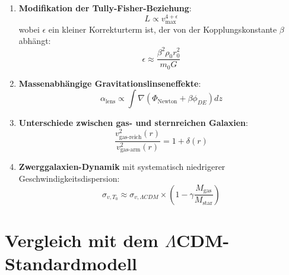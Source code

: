 \documentclass[a4paper,12pt]{article}
\theoremstyle{definition}
\theoremstyle{remark}
\begin{document}
	\begin{enumerate}
		\item \textbf{Modifikation der Tully-Fisher-Beziehung}:
		\begin{equation}
			L \propto v_{\text{max}}^{4+\epsilon}
		\end{equation}
		wobei $\epsilon$ ein kleiner Korrekturterm ist, der von der Kopplungskonstante $\beta$ abhängt:
		\begin{equation}
			\epsilon \approx \frac{\beta^2 \rho_0 r_0^2}{m_0 G}
		\end{equation}
		
		\item \textbf{Massenabhängige Gravitationslinseneffekte}:
		\begin{equation}
			\alpha_{\text{lens}} \propto \int \nabla(\Phi_{\text{Newton}} + \beta\phi_{DE}) dz
		\end{equation}
		
		\item \textbf{Unterschiede zwischen gas- und sternreichen Galaxien}:
		\begin{equation}
			\frac{v^2_{\text{gas-reich}}(r)}{v^2_{\text{gas-arm}}(r)} = 1 + \delta(r)
		\end{equation}
		
		\item \textbf{Zwerggalaxien-Dynamik} mit systematisch niedrigerer Geschwindigkeitsdispersion:
		\begin{equation}
			\sigma_{v,T_0} \approx \sigma_{v,\Lambda CDM} \times \left(1 - \gamma \frac{M_{\text{gas}}}{M_{\text{star}}}\right)
		\end{equation}
	\end{enumerate}
	
	\section{Vergleich mit dem $\Lambda$CDM-Standardmodell}
	
\end{document}
